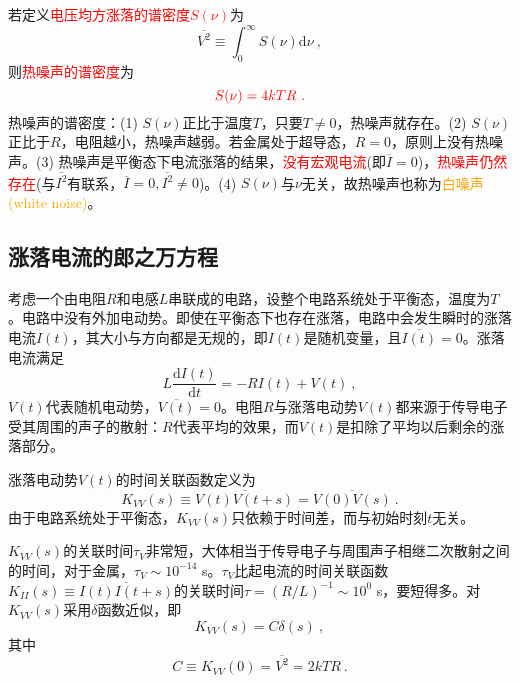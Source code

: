 \documentclass[11pt,a4paper]{article}
\newcommand{\dif}{\mathrm{d}}
\begin{document}
若定义\textcolor{red}{电压均方涨落的谱密度$S(\nu)$}为
\begin{equation}
\overline{V^2} \equiv \int_0^\infty S(\nu) \dif \nu ~,
\end{equation}
则\textcolor{red}{热噪声的谱密度}为
\begin{equation}
\color{red} S(\nu) = 4 k T R ~.
\end{equation}
热噪声的谱密度：(1) $S(\nu)$正比于温度$T$，只要$T \neq 0$，热噪声就存在。(2) $S(\nu)$正比于$R$，电阻越小，热噪声越弱。若金属处于超导态，$R=0$，原则上没有热噪声。(3) 热噪声是平衡态下电流涨落的结果，\textcolor{red}{没有宏观电流}(即$\overline{I} = 0$)，\textcolor{red}{热噪声仍然存在}(与$\overline{I^2}$有联系，$\overline{I} = 0, \overline{I^2} \neq 0$)。(4) $S(\nu)$与$\nu$无关，故热噪声也称为\textcolor{orange}{白噪声(white noise)}。

\subsection{涨落电流的郎之万方程}
考虑一个由电阻$R$和电感$L$串联成的电路，设整个电路系统处于平衡态，温度为$T$。电路中没有外加电动势。即使在平衡态下也存在涨落，电路中会发生瞬时的涨落电流$I(t)$，其大小与方向都是无规的，即$I(t)$是随机变量，且$\overline{I(t)} = 0$。涨落电流满足
\begin{equation}
L \dfrac{\dif I(t)}{\dif t} = - RI(t) + V(t) ~,
\end{equation}
$V(t)$代表随机电动势，$\overline{V(t)} = 0$。电阻$R$与涨落电动势$V(t)$都来源于传导电子受其周围的声子的散射：$R$代表平均的效果，而$V(t)$是扣除了平均以后剩余的涨落部分。

涨落电动势$V(t)$的时间关联函数定义为
\begin{equation}
K_{VV}(s) \equiv \overline{V(t)V(t+s)} = \overline{V(0)V(s)} ~.
\end{equation}
由于电路系统处于平衡态，$K_{VV}(s)$只依赖于时间差，而与初始时刻$t$无关。

$K_{VV}(s)$的关联时间$\tau_V$非常短，大体相当于传导电子与周围声子相继二次散射之间的时间，对于金属，$\tau_V \sim 10^{-14}$ s。$\tau_V$比起电流的时间关联函数$K_{II}(s) \equiv \overline{I(t)I(t+s)}$的关联时间$\tau = (R/L)^{-1} \sim 10^0 $ s，要短得多。对$K_{VV}(s)$采用$\delta$函数近似，即
\begin{equation}
K_{VV}(s) = C\delta(s) ~,
\end{equation}
其中
\begin{equation}
C \equiv K_{VV}(0) = \overline{V^2} = 2k T R~.
\end{equation}
\end{document}
